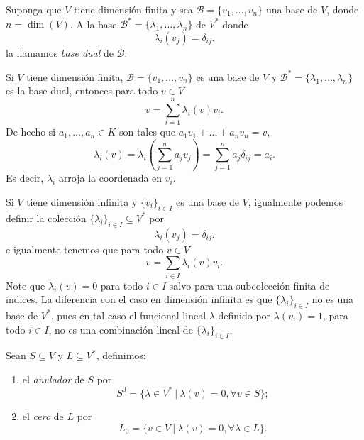 \begin{defn}
Suponga que $V$ tiene dimensi\'on finita y sea $\mathcal{B}=\{v_1,\ldots,v_n\}$ una base de $V$, donde $n=\dim(V)$. A la base $\mathcal{B}^*=\{\lambda_1,\ldots,\lambda_n\}$ de $V^*$ donde
\[
\lambda_i(v_j)=\delta_{ij}.
\]
la llamamos \emph{base dual} de $\mathcal{B}$.
\end{defn}

\begin{obs}\label{basedualfinita}
Si $V$ tiene dimensi\'on finita, $\mathcal{B}=\{v_1,\ldots,v_n\}$ es una base de $V$ y $\mathcal{B}^*=\{\lambda_1,\ldots,\lambda_n\}$ es la base dual, entonces para todo $v\in V$
\[
v=\sum_{i=1}^n\lambda_i(v)v_i.
\]
De hecho si $a_1,\ldots,a_n\in K$ son tales que $a_1v_1+\ldots+a_nv_n=v$,
\[
\lambda_i(v)=\lambda_i\left(\sum_{j=1}^na_jv_j\right)=\sum_{j=1}^n a_j\delta_{ij}=a_i.
\]
Es decir, $\lambda_i$ arroja la coordenada en $v_i$.
\end{obs}

\begin{obs}\label{basedualinfinita}
Si $V$ tiene dimensi\'on infinita y $\{v_i\}_{i\in I}$ es una base de $V$, igualmente podemos definir la colecci\'on $\{\lambda_i\}_{i\in I}\subseteq V^*$ por
\[
\lambda_i(v_j)=\delta_{ij}.
\]
e igualmente tenemos que para todo $v\in V$
\[
v=\sum_{i\in I}\lambda_i(v)v_i.
\]
Note que $\lambda_i(v)=0$ para todo $i\in I$ salvo para una subcolecci\'on finita de indices. La diferencia con el caso en dimensi\'on infinita es que $\{\lambda_i\}_{i\in I}$ no es una base de $V^*$, pues en tal caso el funcional lineal $\lambda$ definido por $\lambda(v_i)=1$, para todo $i\in I$, no es una combinaci\'on lineal de $\{\lambda_i\}_{i\in I}$.
\end{obs}

\begin{defn}
Sean $S\subseteq V$ y $L\subseteq V^*$, definimos:
\begin{enumerate}
\item el \emph{anulador} de $S$ por
\[
S^0=\{\lambda\in V^*\ |\ \lambda(v)=0, \forall v\in S\};
\]
\item el \emph{cero} de $L$ por
\[
L_0=\{v\in V\ |\ \lambda(v)=0, \forall \lambda\in L\}.
\]
\end{enumerate} 
\end{defn}

